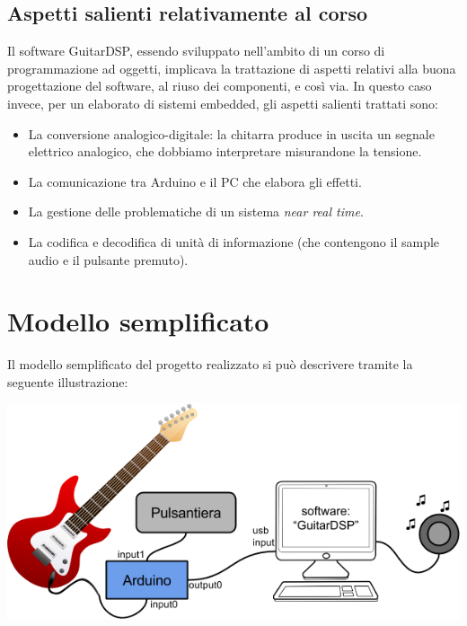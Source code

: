 \documentclass[a4paper,11pt]{article}
\begin{document}
\subsection{Aspetti salienti relativamente al corso}
Il software GuitarDSP, essendo sviluppato nell'ambito di un corso di programmazione ad oggetti, implicava la trattazione di aspetti relativi alla buona progettazione del software, al riuso dei componenti, e così via. In questo caso invece, per un elaborato di sistemi embedded, gli aspetti salienti trattati sono:
\begin{itemize}
	\item La conversione analogico-digitale: la chitarra produce in uscita un segnale elettrico analogico, che dobbiamo interpretare misurandone la tensione.
	\item La comunicazione tra Arduino e il PC che elabora gli effetti.
	\item La gestione delle problematiche di un sistema \textit{near real time}.
	\item La codifica e decodifica di unità di informazione (che contengono il sample audio e il pulsante premuto).
\end{itemize}

\section{Modello semplificato}
Il modello semplificato del progetto realizzato si può descrivere tramite la seguente illustrazione:

\begin{center}
    \includegraphics[width=0.9\linewidth]{fig1.png}
\end{center}
\end{document}
